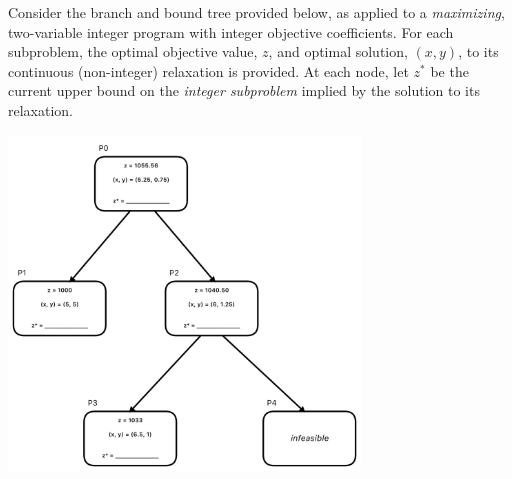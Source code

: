 \documentclass[12pt]{exam}
\begin{document}
\begin{questions}
\bigskip
{}

\newpage


\newpage
\question  Consider the branch and bound tree provided below, as applied to a \emph{maximizing}, two-variable integer program with integer objective coefficients.  For each subproblem, the optimal objective value, $z$, and optimal solution, $(x, y)$, to its continuous (non-integer) relaxation is provided. At each node, let $z^*$ be the current upper bound on the \emph{integer subproblem} implied by the solution to its relaxation.

\vspace{-0.6cm}
\begin{center}
\includegraphics[width=0.7\textwidth]{bb_tree}
\end{center}


\end{questions}
\end{document}
